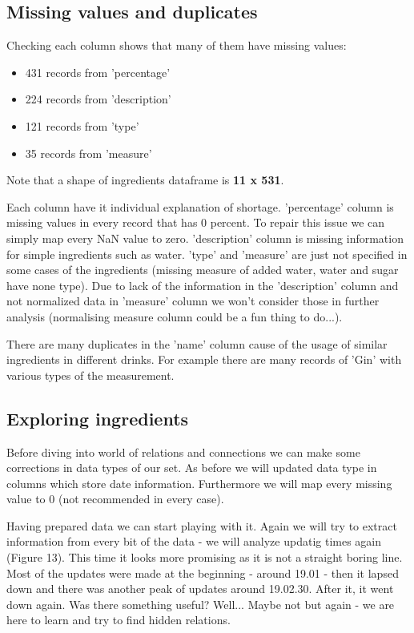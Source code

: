 \documentclass[a4paper]{article}
\begin{document}
\subsection{Missing values and duplicates}
Checking each column shows that many of them have missing values:
\begin{itemize}
    \item 431 records from 'percentage'
    \item 224 records from 'description'
    \item 121 records from 'type'
    \item 35 records from 'measure'
\end{itemize}
Note that a shape of ingredients dataframe is \textbf{11 x 531}.

Each column have it individual explanation of shortage. 'percentage' column is missing values in every record that has 0 percent. To repair this issue we can simply map every NaN value to zero. 'description' column is missing information for simple ingredients such as water. 'type' and 'measure' are just not specified in some cases of the ingredients (missing measure of added water, water and sugar have none type). Due to lack of the information in the 'description' column and not normalized data in 'measure' column we won't consider those in further analysis (normalising measure column could be a fun thing to do...).

There are many duplicates in the 'name' column cause of the usage of similar ingredients in different drinks. For example there are many records of 'Gin' with various types of the measurement.

\subsection{Exploring ingredients}
Before diving into world of relations and connections we can make some corrections in data types of our set. As before we will updated data type in columns which store date information. Furthermore we will map every missing value to 0 (not recommended in every case).

Having prepared data we can start playing with it. Again we will try to extract information from every bit of the data - we will analyze updatig times again (Figure 13). This time it looks more promising as it is not a straight boring line. Most of the updates were made at the beginning - around 19.01 - then it lapsed down and there was another peak of updates around 19.02.30. After it, it went down again. Was there something useful? Well... Maybe not but again - we are here to learn and try to find hidden relations.
\end{document}
